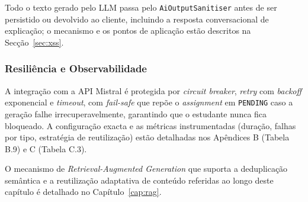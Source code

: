 Todo o texto gerado pelo LLM passa pelo \texttt{AiOutputSanitiser} antes de ser persistido ou devolvido ao cliente, incluindo a resposta conversacional de explicação; o mecanismo e os pontos de aplicação estão descritos na Secção~\ref{sec:xss}.

\subsubsection*{Resiliência e Observabilidade}

A integração com a API Mistral é protegida por \textit{circuit breaker}, \textit{retry} com \textit{backoff} exponencial e \textit{timeout}, com \textit{fail-safe} que repõe o \textit{assignment} em \texttt{PENDING} caso a geração falhe irrecuperavelmente, garantindo que o estudante nunca fica bloqueado. A configuração exacta e as métricas instrumentadas (duração, falhas por tipo, estratégia de reutilização) estão detalhadas nos Apêndices B (Tabela B.9) e C (Tabela C.3).

O mecanismo de \textit{Retrieval-Augmented Generation} que suporta a deduplicação semântica e a reutilização adaptativa de conteúdo referidas ao longo deste capítulo é detalhado no Capítulo~\ref{cap:rag}.
